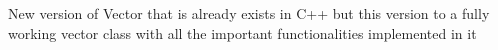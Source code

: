 New version of Vector that is already exists in C++ but this version to a fully working vector class with all the important functionalities implemented in it 
